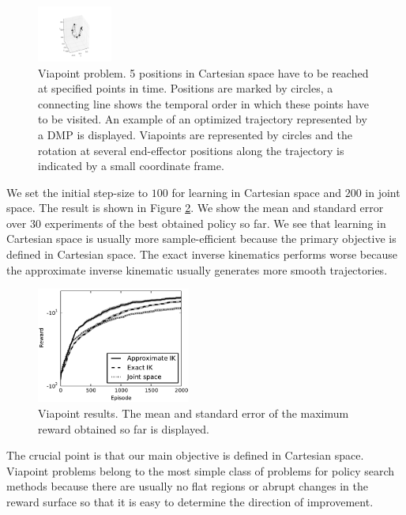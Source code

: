 \documentclass{article}
\begin{document}
\begin{figure}[tb]
\includegraphics[width=0.22\textwidth,clip=true,trim=165 35 165 70]{viapoints}
\centering
\caption{
Viapoint problem.
5 positions in Cartesian space have to be reached at specified points in time.
Positions are marked by circles, a connecting line shows the temporal order
in which these points have to be visited.
An example of an optimized trajectory represented by a DMP is displayed.
Viapoints are represented by circles and the rotation at several
end-effector positions along the trajectory is indicated by a
small coordinate frame.
}
\label{fig:viapoint_env}
\end{figure}


We set the initial step-size to $100$ for learning in Cartesian space
and $200$ in joint space.
The result is shown in Figure \ref{fig:viapoint_res}. We show the
mean and standard error over 30 experiments of the best obtained
policy so far. We see that learning in Cartesian space is usually
more sample-efficient because the primary objective is defined
in Cartesian space. The exact inverse kinematics performs worse
because the approximate inverse kinematic usually generates more
smooth trajectories.

\begin{figure}
\includegraphics[width=0.45\textwidth]{result_comparison_viapoint}
\centering
\caption{
Viapoint results. The mean and standard error of the maximum reward
obtained so far is displayed.
}
\label{fig:viapoint_res}
\end{figure}

The crucial point is that our main objective is defined in Cartesian
space.
Viapoint problems belong to the most simple class of problems for
policy search methods because there are usually no flat regions or
abrupt changes in the reward surface so that it is easy to determine
the direction of improvement.
\end{document}
